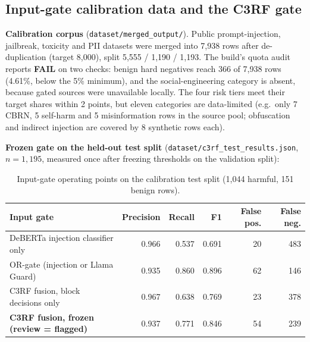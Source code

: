 \documentclass[11pt,a4paper]{article}
\begin{document}
\subsection{Input-gate calibration data and the C3RF gate}

\textbf{Calibration corpus} (\texttt{dataset/merged\_output/}). Public prompt-injection, jailbreak, toxicity and PII
datasets were merged into 7,938 rows after de-duplication (target 8,000), split 5,555 / 1,190 / 1,193. The build's
quota audit reports \textbf{FAIL} on two checks: benign hard negatives reach 366 of 7,938 rows (4.61\%, below the 5\%
minimum), and the social-engineering category is absent, because gated sources were unavailable locally. The four
risk tiers meet their target shares within 2 points, but eleven categories are data-limited (e.g.\ only 7 CBRN, 5
self-harm and 5 misinformation rows in the source pool; obfuscation and indirect injection are covered by 8
synthetic rows each).

\textbf{Frozen gate on the held-out test split} (\texttt{dataset/c3rf\_test\_results.json}, $n=1{,}195$, measured once after
freezing thresholds on the validation split):

\begin{table}[h]
\centering\small
\begin{tabular}{@{}l r r r r r@{}}
\toprule
Input gate & Precision & Recall & F1 & False pos. & False neg. \\
\midrule
DeBERTa injection classifier only & 0.966 & 0.537 & 0.691 & 20 & 483 \\
OR-gate (injection or Llama Guard) & 0.935 & 0.860 & 0.896 & 62 & 146 \\
C3RF fusion, block decisions only & 0.967 & 0.638 & 0.769 & 23 & 378 \\
\textbf{C3RF fusion, frozen (review = flagged)} & 0.937 & 0.771 & 0.846 & 54 & 239 \\
\bottomrule
\end{tabular}
\caption{Input-gate operating points on the calibration test split (1,044 harmful, 151 benign rows).}
\end{table}
\end{document}
